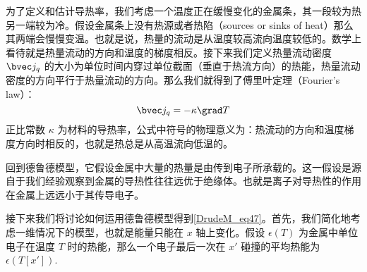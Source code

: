 为了定义和估计导热率，我们考虑一个温度正在缓慢变化的金属条，其一段较为热另一端较为冷。假设金属条上没有热源或者热陷（sources or sinks of heat）那么其两端会慢慢变温。也就是说，热量的流动是从温度较高流向温度较低的。数学上看待就是热量流动的方向和温度的梯度相反。接下来我们定义热量流动密度 $\bvec j_q$ 的大小为单位时间内穿过单位截面（垂直于热流方向）的热能，热量流动密度的方向平行于热量流动的方向。那么我们就得到了傅里叶定理（Fourier's law）：
\begin{equation}
\bvec j_q =-\kappa\grad T
\end{equation}
正比常数 $\kappa$ 为材料的导热率，公式中符号的物理意义为：热流动的方向和温度梯度方向时相反的，也就是热总是从高温流向低温的。

回到德鲁德模型，它假设金属中大量的热量是由传到电子所承载的。这一假设是源自于我们经验观察到金属的导热性往往远优于绝缘体。也就是离子对导热性的作用在金属上远远小于其传导电子。

接下来我们将讨论如何运用德鲁德模型得到\autoref{DrudeM_eq47}。首先，我们简化地考虑一维情况下的模型，也就是能量只能在 $x$ 轴上变化。假设 $\epsilon(T)$ 为金属中单位电子在温度 $T$ 时的热能，那么一个电子最后一次在 $x'$ 碰撞的平均热能为 $\epsilon(T[x'])$.

